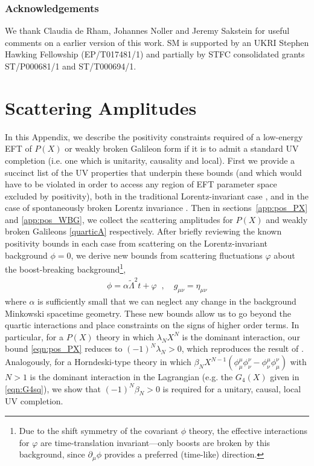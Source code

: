 \documentclass[11pt]{article}
\newcommand{\LambdaP}{\tilde{\Lambda}}
\begin{document}
\subsubsection*{Acknowledgements}
\noindent We thank Claudia de Rham, Johannes Noller and Jeremy Sakstein for useful comments on a earlier version of this work. 
SM is supported by an UKRI Stephen Hawking Fellowship (EP/T017481/1) and partially by STFC consolidated grants ST/P000681/1 and ST/T000694/1.



\appendix
\section{Scattering Amplitudes}
\label{app:positivity}

In this Appendix, we describe the positivity constraints required of a low-energy EFT of $P(X)$ or weakly broken Galileon form if it is to admit a standard UV completion (i.e. one which is unitarity, causality and local). 
First we provide a succinct list of the UV properties that underpin these bounds (and which would have to be violated in order to access any region of EFT parameter space excluded by positivity), both in the traditional Lorentz-invariant case \cite{Adams:2006sv}, and in the case of spontaneously broken Lorentz invariance \cite{Grall:2021xxm}. 
%
Then in sections~\ref{app:pos_PX} and \ref{app:pos_WBG}, we collect the scattering amplitudes for $P(X)$ and weakly broken Galileons \eqref{quarticA} respectively. 
After briefly reviewing the known positivity bounds in each case from scattering on the Lorentz-invariant background $\phi = 0$, we derive new bounds from scattering fluctuations $\varphi$ about the boost-breaking background\footnote{
Due to the shift symmetry of the covariant $\phi$ theory, the effective interactions for $\varphi$ are time-translation invariant---only boosts are broken by this background, since $\partial_\mu \phi$ provides a preferred (time-like) direction. 
},
\begin{align}
 \phi = \alpha \LambdaP^2 t + \varphi \;\; , \quad g_{\mu\nu} = \eta_{\mu\nu} 
 \label{eqn:pos_background}
 \end{align}
where $\alpha$ is sufficiently small that we can neglect any change in the background Minkowski spacetime geometry.
These new bounds allow us to go beyond the quartic interactions and place constraints on the signs of higher order terms. In particular, for a $P(X)$ theory in which  $\lambda_N X^N$ is the dominant interaction, our bound \eqref{eqn:pos_PX} reduces to $(-1)^N \lambda_N > 0$, which reproduces the result of \cite{Chandrasekaran:2018qmx}. Analogously, for a Horndeski-type theory in which $\beta_N X^{N-1} \left( \phi^\mu_\mu \phi^\nu_\nu - \phi^{\mu}_\nu \phi^\nu_\mu \right)$ with $N > 1$ is the dominant interaction in the Lagrangian (e.g. the $G_4  (X)$ given in \eqref{eqn:G4sq}), we show that $(-1)^N \beta_N > 0$ is required for a unitary, causal, local UV completion.   
\end{document}
